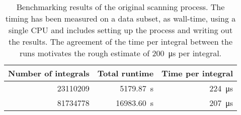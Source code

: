 \begin{table}[htbp]
	\centering
	\begin{tabular}{| r | r || r |}
		\hline
		Number of integrals & Total runtime & Time per integral \\
		\hline \hline
		\num{23110209} & \SI{5179.87}{\second} & \SI{224}{\micro\second} \\
		\num{81734778} & \SI{16983.60}{\second} & \SI{207}{\micro\second} \\
		\hline
	\end{tabular}
	\caption{Benchmarking results of the original scanning process. The timing has been measured on a data subset, as wall-time, using a single CPU and includes setting up the process and writing out the results. The agreement of the time per integral between the runs motivates the rough estimate of \SI{200}{\micro\second} per integral.}
	\label{tbl:motivation_timing}
\end{table}